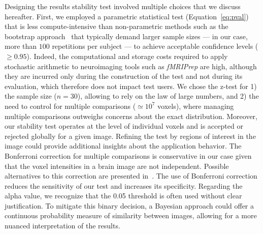 \documentclass[lettersize,journal]{IEEEtran}
\newcommand{\fmriprep}{\emph{fMRIPrep}\xspace}
\newcommand{\add}[1]{{#1}} %
\begin{document}
Designing the results stability test involved multiple choices that we discuss
hereafter. First, we employed a parametric statistical test
(Equation~\ref{eq:pval}) that is less compute-intensive than non-parametric
methods \add{such as the bootstrap approach~\cite{zrimvsek2024quantifying}}
that typically demand larger sample sizes --- in our case, more than $100$
repetitions per subject --- to achieve acceptable confidence levels ($\geq
  0.95$). Indeed, the computational and storage costs required to apply
stochastic arithmetic to neuroimaging tools such as \fmriprep are high,
although they are incurred only during the construction of the test and not
during its evaluation, which therefore does not impact test users. \add{We
  chose the z-test for 1) the sample size ($n = 30$), allowing to rely on the law
  of large numbers, and 2) the need to control for multiple comparisons
  ($\simeq10^7$ voxels), where managing multiple comparisons outweighs concerns
  about the exact distribution.} Moreover, our stability test operates at the
level of individual voxels and is accepted or rejected globally for a given
image. Refining the test by regions of interest in the image could provide
additional insights about the application behavior. The Bonferroni correction
for multiple comparisons is conservative in our case given that the voxel
intensities in a brain image are not independent. Possible alternatives to this
correction are presented in~\cite{NICHOLS2007246}. The use of Bonferroni
correction reduces the sensitivity of our test and increases its specificity.
\add{Regarding the alpha value, we recognize that the 0.05 threshold is often
  used without clear justification. To mitigate this binary decision, a Bayesian
  approach could offer a continuous probability measure of similarity between
  images, allowing for a more nuanced interpretation of the results.}
\end{document}
